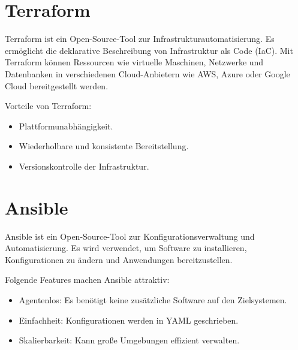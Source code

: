 \section{Terraform}
Terraform ist ein Open-Source-Tool zur Infrastrukturautomatisierung. Es ermöglicht die deklarative Beschreibung von Infrastruktur als Code (IaC). Mit Terraform können Ressourcen wie virtuelle Maschinen, Netzwerke und Datenbanken in verschiedenen Cloud-Anbietern wie AWS, Azure oder Google Cloud bereitgestellt werden\cite{TerraformDocs}.

Vorteile von Terraform:
\begin{itemize}
    \item Plattformunabhängigkeit.
    \item Wiederholbare und konsistente Bereitstellung.
    \item Versionskontrolle der Infrastruktur.
\end{itemize}

\section{Ansible}
Ansible ist ein Open-Source-Tool zur Konfigurationsverwaltung und Automatisierung. Es wird verwendet, um Software zu installieren, Konfigurationen zu ändern und Anwendungen bereitzustellen\cite{AnsibleDocs}.

Folgende Features machen Ansible attraktiv:
\begin{itemize}
    \item Agentenlos: Es benötigt keine zusätzliche Software auf den Zielsystemen.
    \item Einfachheit: Konfigurationen werden in YAML geschrieben.
    \item Skalierbarkeit: Kann große Umgebungen effizient verwalten.
\end{itemize}